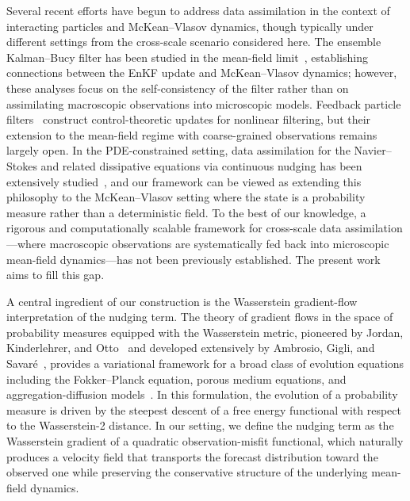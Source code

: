Several recent efforts have begun to address data assimilation in the context of interacting particles and McKean--Vlasov dynamics, though typically under different settings from the cross-scale scenario considered here. The ensemble Kalman--Bucy filter has been studied in the mean-field limit~\cite{de2018long,del2017stability}, establishing connections between the EnKF update and McKean--Vlasov dynamics; however, these analyses focus on the self-consistency of the filter rather than on assimilating macroscopic observations into microscopic models. Feedback particle filters~\cite{yang2011mean} construct control-theoretic updates for nonlinear filtering, but their extension to the mean-field regime with coarse-grained observations remains largely open. In the PDE-constrained setting, data assimilation for the Navier--Stokes and related dissipative equations via continuous nudging has been extensively studied~\cite{azouani2014continuous,albanez2016continuous,jolly2017data,bessaih2015continuous}, and our framework can be viewed as extending this philosophy to the McKean--Vlasov setting where the state is a probability measure rather than a deterministic field. To the best of our knowledge, a rigorous and computationally scalable framework for cross-scale data assimilation---where macroscopic observations are systematically fed back into microscopic mean-field dynamics---has not been previously established. The present work aims to fill this gap.

A central ingredient of our construction is the Wasserstein gradient-flow interpretation of the nudging term. The theory of gradient flows in the space of probability measures equipped with the Wasserstein metric, pioneered by Jordan, Kinderlehrer, and Otto~\cite{jordan1998variational} and developed extensively by Ambrosio, Gigli, and Savar\'{e}~\cite{ambrosio2005gradient}, provides a variational framework for a broad class of evolution equations including the Fokker--Planck equation, porous medium equations, and aggregation-diffusion models~\cite{carrillo2003kinetic,carrillo2019aggregation}. In this formulation, the evolution of a probability measure is driven by the steepest descent of a free energy functional with respect to the Wasserstein-2 distance.  In our setting, we define the nudging term as the Wasserstein gradient of a quadratic observation-misfit functional, which naturally produces a velocity field that transports the forecast distribution toward the observed one while preserving the conservative structure of the underlying mean-field dynamics.

